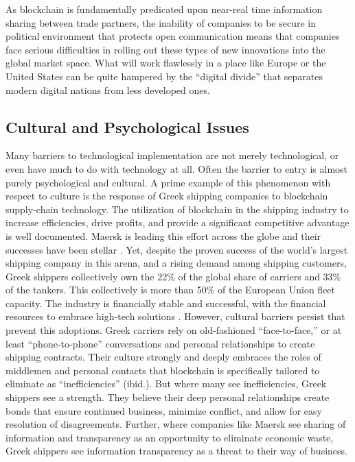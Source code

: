 As blockchain is fundamentally predicated upon near-real time information sharing between trade partners, the inability of companies to be secure in political environment that protects open communication means that companies face serious difficulties in rolling out these types of new innovations into the global market space. What will work flawlessly in a place like Europe or the United States can be quite hampered by the ``digital divide'' that separates modern digital nations from less developed ones.

\subsection{Cultural and Psychological Issues}

Many barriers to technological implementation are not merely technological, or even have much to do with technology at all. Often the barrier to entry is almost purely psychological and cultural. A prime example of this phenomenon with respect to culture is the response of Greek shipping companies to blockchain supply-chain technology. The utilization of blockchain in the shipping industry to increase efficiencies, drive profits, and provide a significant competitive advantage is well documented. Maersk is leading this effort across the globe and their successes have been stellar \parencite{groenfeldtIBMMaerskApply2017}. Yet, despite the proven success of the world's largest shipping company in this arena, and a rising demand among shipping customers, Greek shippers collectively own the 22\% of the global share of carriers and 33\% of the tankers. This collectively is more than 50\% of the European Union fleet capacity. The industry is financially stable and successful, with the financial resources to embrace high-tech solutions \parencite{papathanasiouNonApplicationBlockchain2020}. However, cultural barriers persist that prevent this adoptions. Greek carriers rely on old-fashioned ``face-to-face,'' or at least ``phone-to-phone'' conversations and personal relationships to create shipping contracts. Their culture strongly and deeply embraces the roles of middlemen and personal contacts that blockchain is specifically tailored to eliminate as ``inefficiencies'' (ibid.). But where many see inefficiencies, Greek shippers see a strength. They believe their deep personal relationships create bonds that ensure continued business, minimize conflict, and allow for easy resolution of disagreements. Further, where companies like Maersk see sharing of information and transparency as an opportunity to eliminate economic waste, Greek shippers see information transparency as a threat to their way of business.

